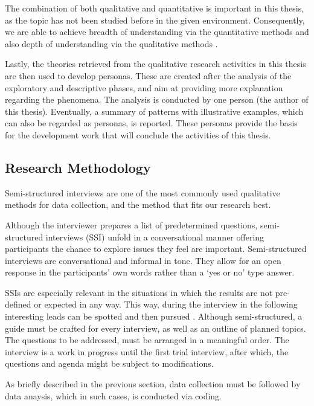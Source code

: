The combination of both qualitative and quantitative is important in this thesis, as the topic has not been studied before in the given environment. Consequently, we are able to achieve breadth of understanding via the quantitative methods and also depth of understanding via the qualitative methods \cite{Patton2002}.

Lastly, the theories retrieved from the qualitative research activities in this thesis are then used to develop personas. These are created after the analysis of the exploratory and descriptive phases, and aim at providing more explanation regarding the phenomena. The analysis is conducted by one person (the author of this thesis). Eventually, a summary of patterns with illustrative examples, which can also be regarded as personas, is reported. These personas provide the basis for the development work that will conclude the activities of this thesis. 

\subsection{Research Methodology} \label{ResearchMethodology}

Semi-structured interviews are one of the most commonly used qualitative methods for data collection, and the method that fits our research best.

Although the interviewer prepares a list of predetermined questions, semi-structured interviews (SSI) unfold in a conversational manner offering participants the chance to explore issues
they feel are important. Semi-structured interviews are conversational and informal in tone. They allow for an open response in the participants’ own words rather than a ‘yes or no’ type answer. 

SSIs are especially relevant in the situations in which the results are not pre-defined or expected in any way. This way, during the interview in the following interesting leads can be spotted and then pursued \cite{Adams2015}. Although semi-structured, a guide must be crafted for every interview, as well as an outline of planned topics. The questions to be addressed, must be arranged in a meaningful order. The interview is a work in progress until the first trial interview, after which, the questions and agenda might be subject to modifications.

As briefly described in the previous section, data collection must be followed by data anaysis, which in such cases, is conducted via coding. 

